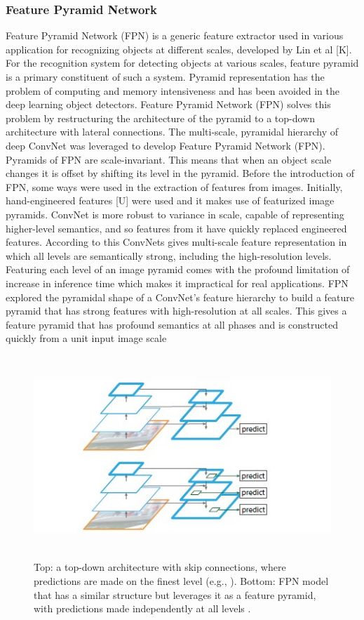\subsubsection{Feature Pyramid Network}
Feature Pyramid Network (FPN) is a generic feature extractor used in various application for recognizing objects at different scales, developed by Lin et al [K]. For the recognition system for detecting objects at various scales, feature pyramid is a primary constituent of such a system. Pyramid representation has the problem of computing and memory intensiveness and has been avoided in the deep learning object detectors. 
Feature Pyramid Network (FPN) solves this problem by restructuring the architecture of the pyramid to a top-down architecture with lateral connections. The multi-scale, pyramidal hierarchy of deep ConvNet was leveraged to develop Feature Pyramid Network (FPN). Pyramids of  FPN are scale-invariant. This means that when an object scale changes it is offset by shifting its level in the pyramid.  
 Before the introduction of FPN, some ways were used in the extraction of features from images. Initially, hand-engineered features [U] were used and it makes use of featurized image pyramids. ConvNet is more robust to variance in scale, capable of representing higher-level semantics, and so features from it have quickly replaced engineered features. 
 According to \cite{L} this ConvNets gives multi-scale feature representation in which all levels are semantically strong, including the high-resolution levels.  Featuring each level of an image pyramid comes with the profound limitation of increase in inference time which makes it impractical for real applications. FPN explored the pyramidal shape of a ConvNet’s feature hierarchy to build a feature pyramid that has strong features
  with high-resolution at all scales. 
 This gives a feature pyramid that has profound semantics at all phases and is constructed quickly  from a unit  input image scale 
\begin{figure}[H]
\centering
  \includegraphics[height=3in]{images/fpn.jpg}
   \caption{Top: a top-down architecture with skip connections, where predictions are made on the finest level (e.g., \cite{T}). Bottom: FPN model that has a similar structure but leverages it as a feature pyramid, with predictions made independently at all levels \cite{K}.}
\end{figure}

